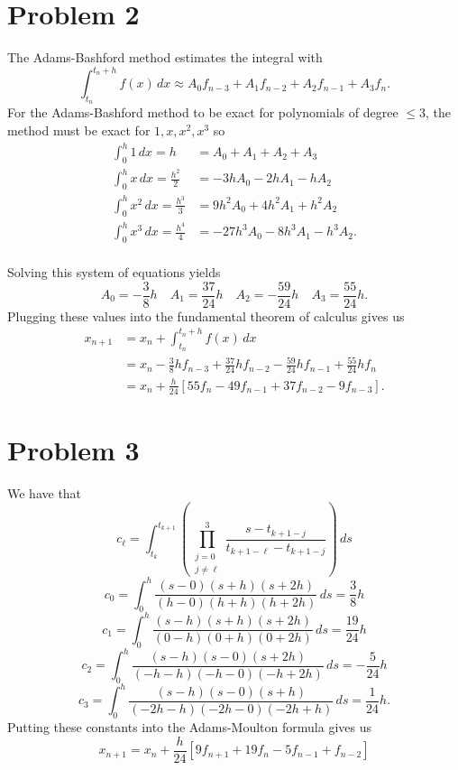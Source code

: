 \documentclass{article}
\begin{document}
\section*{Problem 2}
The Adams-Bashford method estimates the integral with
\[
	\int_{t_n}^{t_n+h} f(x) \,dx \approx A_0 f_{n-3} + A_1 f_{n-2} + A_2 f_{n-1} + A_3 f_{n}.
\]
For the Adams-Bashford method to be exact for polynomials of degree $\leq 3$,
the method must be exact for $1, x, x^2, x^3$ so
\begin{align*}
	\int_0^h 1 \,dx = h &= A_0 + A_1 + A_2 + A_3 \\
	\int_0^h x \,dx = \frac{h^2}{2} &= -3hA_0 -2hA_1 -hA_2 \\
	\int_0^h x^2 \,dx = \frac{h^3}{3} &= 9h^2A_0 + 4h^2A_1 + h^2A_2\\
	\int_0^h x^3 \,dx = \frac{h^4}{4} &= -27h^3A_0 -8h^3A_1 -h^3 A_2.  \\
\end{align*}

Solving this system of equations yields
\[
	A_0 = -\frac{3}{8}h \quad A_1 = \frac{37}{24}h \quad 
	A_2 = -\frac{59}{24}h \quad A_3 = \frac{55}{24}h.
\]
Plugging these values into the fundamental theorem of calculus gives us 
\begin{align*}
	x_{n+1} &= x_n + \int_{t_n}^{t_n+h} f(x) \,dx \\
	&= x_n -\frac{3}{8}h f_{n-3} + \frac{37}{24}h f_{n-2} -\frac{59}{24}h f_{n-1} + \frac{55}{24}h f_{n} \\
	&= x_n + \frac{h}{24}[55f_n - 49f_{n-1} + 37f_{n-2} - 9f_{n-3}].
\end{align*}
\newpage 

\section*{Problem 3}
We have that 
\[
	c_\ell = \int_{t_k}^{t_{k+1}} \left(\prod_{\substack{j=0 \\ j \neq \ell}}^3 \frac{s- t_{k+1-j}}{t_{k+1-\ell}- t_{k+1-j}}\right) \,ds
\]
\[
	c_0 = \int_0^h \frac{(s-0)(s+h)(s+2h)}{(h-0)(h+h)(h+2h)} \,ds = \frac{3}{8}h
\]
\[
	c_1 = \int_0^h \frac{(s-h)(s+h)(s+2h)}{(0-h)(0+h)(0+2h)} \,ds = \frac{19}{24}h 
\]
\[
	c_2 = \int_0^h \frac{(s-h)(s-0)(s+2h)}{(-h-h)(-h-0)(-h+2h)} \,ds = -\frac{5}{24}h 
\]
\[
	c_3 = \int_0^h \frac{(s-h)(s-0)(s+h)}{(-2h-h)(-2h-0)(-2h+h)} \,ds = \frac{1}{24}h.
\]
Putting these constants into the Adams-Moulton formula gives us 
\[
	x_{n+1} = x_n + \frac{h}{24}[9f_{n+1} + 19f_n - 5f_{n-1} + f_{n-2}]
\]
\newpage 
\end{document}

